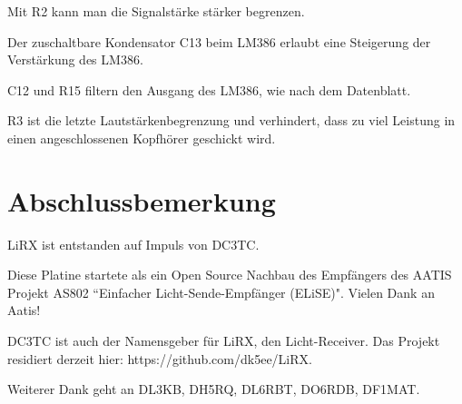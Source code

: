 \documentclass[]{article}
\begin{document}
Mit R2 kann man die Signalstärke stärker begrenzen.

Der zuschaltbare Kondensator C13 beim LM386 erlaubt eine Steigerung der Verstärkung des LM386.

C12 und R15 filtern den Ausgang des LM386, wie nach dem Datenblatt.

R3 ist die letzte Lautstärkenbegrenzung und verhindert, dass zu viel Leistung in einen angeschlossenen Kopfhörer geschickt wird.

\section{Abschlussbemerkung}
LiRX ist entstanden auf Impuls von DC3TC.

Diese Platine startete als ein Open Source Nachbau des Empfängers des AATIS Projekt AS802 ``Einfacher Licht-Sende-Empfänger (ELiSE)". Vielen Dank an Aatis!

DC3TC ist auch der Namensgeber für LiRX, den Licht-Receiver. Das Projekt residiert derzeit hier: https://github.com/dk5ee/LiRX.

Weiterer Dank geht an DL3KB, DH5RQ, DL6RBT, DO6RDB, DF1MAT.
\end{document}
